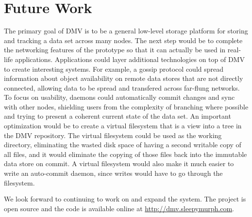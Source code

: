 \section{Future Work}

The primary goal of DMV is to be a general low-level storage platform for
storing and tracking a data set across many nodes. The next step would be to
complete the networking features of the prototype so that it can actually be
used in real-life applications. Applications could layer additional technologies
on top of DMV to create interesting systems. For example, a gossip protocol
could spread information about object availability on remote data stores that
are not directly connected, allowing data to be spread and transfered across
far-flung networks. To focus on usability, daemons could automatically commit
changes and sync with other nodes, shielding users from the complexity of
branching where possible and trying to present a coherent current state of the
data set. An important optimization would be to create a virtual filesystem that
is a view into a \gls{tree} in the DMV repository. The virtual filesystem could
be used as the working directory, eliminating the wasted disk space of having a
second writable copy of all files, and it would eliminate the copying of those
files back into the immutable data store on commit. A virtual filesystem would
also make it much easier to write an auto-commit daemon, since writes would have
to go through the filesystem.

We look forward to continuing to work on and expand the system. The project is
open source and the code is available online at
\url{http://dmv.sleepymurph.com}.
